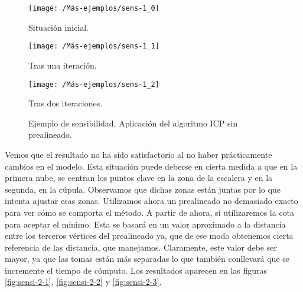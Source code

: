 \begin{figure}[h!]	
	\begin{minipage}[b]{0.5\textwidth}
		\centering		
		\texttt{[image: /Más-ejemplos/sens-1\_0]} 
		\caption*{Situación inicial.}
	\end{minipage}
	\begin{minipage}[b]{0.5\textwidth}
		\centering
		\texttt{[image: /Más-ejemplos/sens-1\_1]}
		\caption*{Tras una iteración.}
	\end{minipage}
	\begin{center}
		\begin{minipage}[b]{0.5\textwidth}
		\centering		
		\texttt{[image: /Más-ejemplos/sens-1\_2]} 
		\caption*{Tras dos iteraciones.}
	\end{minipage}
	\end{center}
	\caption{Ejemplo de sensibilidad. Aplicación del algoritmo ICP sin prealineado.}
	\label{fig:sensi-1}
\end{figure}

Vemos que el resultado no ha sido satisfactorio al no haber prácticamente cambios en el modelo. Esta situación puede deberse en cierta medida a que en la primera nube, se centran los puntos clave en la zona de la escalera y en la segunda, en la cúpula. Observamos que dichas zonas están juntas por lo que intenta ajustar esas zonas. Utilizamos ahora un prealineado no demasiado exacto para ver cómo se comporta el método.  A partir de ahora, sí utilizaremos la cota para aceptar el mínimo. Esta se basará en un valor aproximado a la distancia entre los terceros vértices del prealineado ya, que de ese modo obtenemos cierta referencia de las distancia, que manejamos. Claramente, este valor debe ser mayor, ya que las tomas están más separadas lo que también conllevará que se incremente el tiempo de cómputo. Los resultados aparecen en las figuras \ref{fig:sensi-2-1}, \ref{fig:sensi-2-2} y \ref{fig:sensi-2-3}.\\

